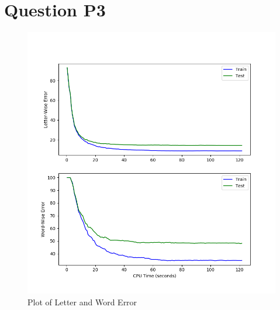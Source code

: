 \documentclass[11pt]{report}
\begin{document}
\section*{Question P3}

\begin{figure}[b]
\centering
\includegraphics[scale=0.4]{p3_figure.png}
\caption{Plot of Letter and Word Error}
\end{figure}
\end{document}

